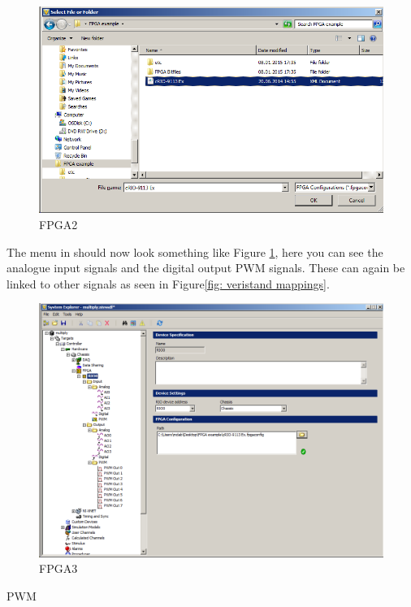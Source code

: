\documentclass[a4paper,twoside,english]{report}
\begin{document}
\begin{figure}[!h]
\centering \includegraphics[scale=0.45]{fig/fpga2}

\caption{FPGA2}

\label{fig: fpga2}
\end{figure}

The menu in should now look something like Figure \ref{fig: fpga2},
here you can see the analogue input signals and the digital output
PWM signals. These can again be linked to other signals as seen in
Figure\ref{fig: veristand mappings}.

\begin{figure}
\includegraphics[scale=0.45]{fig/fpga3}

\caption{FPGA3}

\label{fig: fpga3}
\end{figure}

PWM
\end{document}
